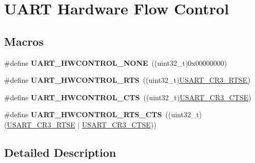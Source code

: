 \hypertarget{group___u_a_r_t___hardware___flow___control}{}\section{U\+A\+RT Hardware Flow Control}
\label{group___u_a_r_t___hardware___flow___control}
\subsection*{Macros}
\begin{DoxyCompactItemize}
\item 
\#define {\bfseries U\+A\+R\+T\+\_\+\+H\+W\+C\+O\+N\+T\+R\+O\+L\+\_\+\+N\+O\+NE}~((uint32\+\_\+t)0x00000000)\hypertarget{group___u_a_r_t___hardware___flow___control_gae0569001c06b7760cd38c481f84116cf}{}\label{group___u_a_r_t___hardware___flow___control_gae0569001c06b7760cd38c481f84116cf}

\item 
\#define {\bfseries U\+A\+R\+T\+\_\+\+H\+W\+C\+O\+N\+T\+R\+O\+L\+\_\+\+R\+TS}~((uint32\+\_\+t)\hyperlink{group___peripheral___registers___bits___definition_ga7c5d6fcd84a4728cda578a0339b4cac2}{U\+S\+A\+R\+T\+\_\+\+C\+R3\+\_\+\+R\+T\+SE})\hypertarget{group___u_a_r_t___hardware___flow___control_ga6d5dad09c6abf30f252084ba0f8c0b7d}{}\label{group___u_a_r_t___hardware___flow___control_ga6d5dad09c6abf30f252084ba0f8c0b7d}

\item 
\#define {\bfseries U\+A\+R\+T\+\_\+\+H\+W\+C\+O\+N\+T\+R\+O\+L\+\_\+\+C\+TS}~((uint32\+\_\+t)\hyperlink{group___peripheral___registers___bits___definition_gaa125f026b1ca2d76eab48b191baed265}{U\+S\+A\+R\+T\+\_\+\+C\+R3\+\_\+\+C\+T\+SE})\hypertarget{group___u_a_r_t___hardware___flow___control_ga352f517245986e3b86bc75f8472c51ea}{}\label{group___u_a_r_t___hardware___flow___control_ga352f517245986e3b86bc75f8472c51ea}

\item 
\#define {\bfseries U\+A\+R\+T\+\_\+\+H\+W\+C\+O\+N\+T\+R\+O\+L\+\_\+\+R\+T\+S\+\_\+\+C\+TS}~((uint32\+\_\+t)(\hyperlink{group___peripheral___registers___bits___definition_ga7c5d6fcd84a4728cda578a0339b4cac2}{U\+S\+A\+R\+T\+\_\+\+C\+R3\+\_\+\+R\+T\+SE} $\vert$ \hyperlink{group___peripheral___registers___bits___definition_gaa125f026b1ca2d76eab48b191baed265}{U\+S\+A\+R\+T\+\_\+\+C\+R3\+\_\+\+C\+T\+SE}))\hypertarget{group___u_a_r_t___hardware___flow___control_ga7c91698e8f08ba7ed3f2a0ba9aa27d73}{}\label{group___u_a_r_t___hardware___flow___control_ga7c91698e8f08ba7ed3f2a0ba9aa27d73}

\end{DoxyCompactItemize}


\subsection{Detailed Description}

